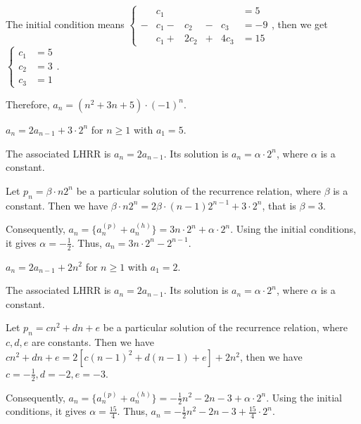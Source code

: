 \documentclass[11pt]{article}
\begin{document}
\begin{qparts}
\begin{solution}
    The initial condition means 
    $\left\{
        \begin{alignedat}{4}
            &c_1&&&&=5\\
            -&c_1-{}&c_2&-{}&c_3&=-9\\
            &c_1+{}&2c_2&+{}&4c_3&=15
        \end{alignedat}
    \right.
    $, then we get $
    \left\{
        \begin{alignedat}{2}
            c_1&=5\\
            c_2&=3\\
            c_3&=1
        \end{alignedat}
    \right.$.

    Therefore, $a_n=\left( n^{2}+3n+5 \right)\cdot (-1)^{n} $.
    \end{solution}

    \item $a_n=2 a_{n-1}+3\cdot 2^{n}$ for $n\ge 1$ with 
    $a_1=5$.
    \begin{solution}
        The associated LHRR is $a_n=2 a_{n-1}$. Its solution is 
        $a_{n}=\alpha\cdot 2^{n}$, where $\alpha$ is a constant.

        Let $p_n=\beta \cdot n 2^{n}$ be a particular solution of the recurrence relation, where $\beta$ is a constant. Then we have 
        $\beta\cdot n 2^{n}=2\beta\cdot (n-1)2^{n-1}+3\cdot 2^{n}$, that is 
        $\beta=3$. 

        Consequently, $a_{n}=\{ a_{n}^{(p)}+a_{n}^{(h)} \}=3n\cdot 2^{n}+\alpha\cdot 2^{n}$. Using the initial conditions, it gives $\alpha=-\frac{1}{2}$. Thus, $a_n=3n\cdot 2^{n}-2^{n-1}$.
    
    \end{solution}

    \item $a_n=2 a_{n-1}+2n^{2}$ for $n\ge 1$ with $a_1=2$.
    \begin{solution}
        The associated LHRR is $a_n=2 a_{n-1}$. Its solution is 
        $a_{n}=\alpha\cdot 2^{n}$, where $\alpha$ is a constant.

        Let $p_n=cn^{2}+dn+e$ be a particular solution of the recurrence relation, where $c,d,e$ are constants. Then we have 
        $cn^{2}+dn+e=2\left[ c(n-1)^{2}+d(n-1)+e \right]+2n^{2} 
        $, then we have
        $c=-\frac{1}{2},d=-2,e=-3$. 

        Consequently, $a_{n}=\{ a_{n}^{(p)}+a_{n}^{(h)} \}=
        -\frac{1}{2}n^{2}-2n-3+\alpha\cdot 2^{n}$. Using the initial conditions, it gives $\alpha=\frac{15}{4}$. Thus, $a_n=-\frac{1}{2}n^{2}-2n-3+\frac{15}{4}\cdot 2^{n}$.
    
    \end{solution}
\end{qparts}
\end{document}
